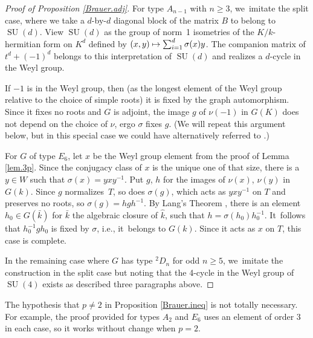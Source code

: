 \documentclass[JEP,XML,SOM,Unicode,NoFloatCountersInSection,published]{cedram}
\newcommand\mto{\mathchoice{\longmapsto}{\mapsto}{\mapsto}{\mapsto}}
\theoremstyle{definition}
\DeclareMathOperator{\SU}{SU}
\newcommand{\kh}{\hat{k}}
\newcommand{\kalg}{\bar{k}}
\begin{document}
\begin{proof}[Proof of Proposition \ref{Brauer.adj}]
For type $A_{n-1}$ with $n \ge 3$, we~imitate the split case, where we take a $d$-by-$d$ diagonal block of the matrix $B$ to belong to $\SU(d)$. View $\SU(d)$ as the group of norm~1 isometries of the $K/k$-hermitian form on $K^d$ defined by
$(x, y) \mto \sum_{i=1}^d \sigma(x) y$. The companion matrix of $t^d + (-1)^d$ belongs to this interpretation of $\SU(d)$ and realizes a $d$-cycle in the Weyl group.

If $-1$ is in the Weyl group, then (as the longest element of the Weyl group relative to the choice of simple roots) it is fixed by the graph automorphism. Since it fixes no roots and $G$ is adjoint, the image $g$ of $\nu(-1)$ in $G(K)$ does not depend on the choice of $\nu$, ergo $\sigma$ fixes $g$. (We will repeat this argument below, but in this special case we could have alternatively referred to \cite[Prop.\,XXIV.3.16.2(iii)]{SGA3.3:new}.)

For $G$ of type $E_6$, let $x$ be the Weyl group element from the proof of Lemma \ref{lem.3p}. Since the conjugacy class of $x$ is the unique one of that size, there is a $y \in W$ such that $\sigma(x) = yxy^{-1}$. Put $g$, $h$ for the images of $\nu(x)$, $\nu(y)$ in $G(k)$. Since $g$ normalizes~$T$, so does $\sigma(g)$, which acts as $yxy^{-1}$ on $T$ and preserves no roots, so $\sigma(g) = hgh^{-1}$. By Lang's Theorem \cite[Cor.\,17.97]{Milne}, there is an element $h_0 \in G(\kalg)$ for $\kalg$ the algebraic closure of $\kh$, such that $h = \sigma(h_0) h_0^{-1}$. It~follows that
$h_0^{-1} g h_0$ is fixed by $\sigma$, i.e., it~belongs to $G(k)$. Since it acts as $x$ on $T$, this case is complete.\enlargethispage{\baselineskip}%

In the remaining case where $G$ has type $^2D_n$ for odd $n \ge 5$, we~imitate the construction in the split case but noting that the 4-cycle in the Weyl group of $\SU(4)$ exists as described three paragraphs above.
\end{proof}

The hypothesis that $p \ne 2$ in Proposition \ref{Brauer.ineq} is not totally necessary. For example, the proof provided for types $A_2$ and $E_6$ uses an element of order 3 in each case, so it works without change when $p = 2$.
\end{document}

